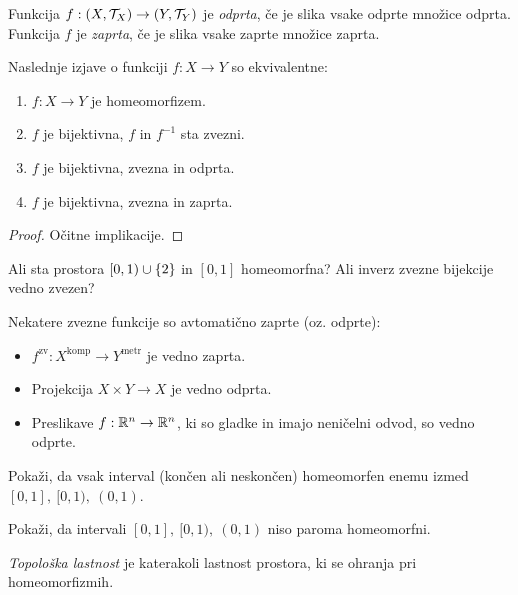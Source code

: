 \begin{definicija}
    Funkcija $f: (X, \mathcal{T}_X) \to (Y, \mathcal{T}_Y)$ je \emph{odprta}, če je slika vsake odprte množice odprta. Funkcija $f$ je \emph{zaprta}, če je slika vsake zaprte množice zaprta.
\end{definicija}

\begin{trditev}
    Naslednje izjave o funkciji $f: X \to Y$ so ekvivalentne:
    \begin{enumerate}
        \item $f: X \to Y$ je homeomorfizem.
        \item $f$ je bijektivna, $f$ in $f^{-1}$ sta zvezni.
        \item $f$ je bijektivna, zvezna in odprta.
        \item $f$ je bijektivna, zvezna in zaprta.
    \end{enumerate}
\end{trditev}

\begin{proof}
    Očitne implikacije.
\end{proof}

\begin{primer} 
    Ali sta prostora $[0, 1) \cup \left\{2\right\}$ in $[0,1]$ homeomorfna? Ali inverz zvezne bijekcije vedno zvezen?
\end{primer}

\newpage
\begin{trditev}
    Nekatere zvezne funkcije so avtomatično zaprte (oz. odprte):
    \begin{itemize}
        \item $f^{\text{zv}}: X^{\text{komp}} \to Y^{\text{metr}}$ je vedno zaprta.
        \item Projekcija $X \times Y \to X$ je vedno odprta.
        \item Preslikave $f: \mathbb{R}^n \to \mathbb{R}^n$, ki so gladke in imajo neničelni odvod, so vedno odprte.
    \end{itemize}
\end{trditev}

\begin{primer}
    Pokaži, da vsak interval (končen ali neskončen) homeomorfen enemu izmed $[0,1], \ [0, 1), \ (0,1)$.

    Pokaži, da intervali $[0,1], \ [0, 1), \ (0,1)$ niso paroma homeomorfni.
\end{primer}

\begin{definicija}
    \emph{Topološka lastnost} je katerakoli lastnost prostora, ki se ohranja pri homeomorfizmih.
\end{definicija}

